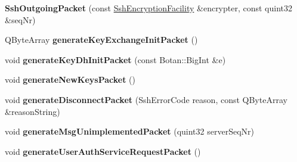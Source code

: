 \begin{DoxyCompactItemize}
\item 
\mbox{\label{class_q_ssh_1_1_internal_1_1_ssh_outgoing_packet_aa417768fd580479f96749cbc91fa8faf}} 
{\bfseries Ssh\+Outgoing\+Packet} (const \mbox{\hyperlink{class_q_ssh_1_1_internal_1_1_ssh_encryption_facility}{Ssh\+Encryption\+Facility}} \&encrypter, const quint32 \&seq\+Nr)
\item 
\mbox{\label{class_q_ssh_1_1_internal_1_1_ssh_outgoing_packet_a1e7a17cf44c369d49f40f5f865a3558f}} 
Q\+Byte\+Array {\bfseries generate\+Key\+Exchange\+Init\+Packet} ()
\item 
\mbox{\label{class_q_ssh_1_1_internal_1_1_ssh_outgoing_packet_a70b75f4a8fb7222a2385e0599aad2878}} 
void {\bfseries generate\+Key\+Dh\+Init\+Packet} (const Botan\+::\+Big\+Int \&e)
\item 
\mbox{\label{class_q_ssh_1_1_internal_1_1_ssh_outgoing_packet_a5cacc93b2fe7a0f1efbaebe824b814e1}} 
void {\bfseries generate\+New\+Keys\+Packet} ()
\item 
\mbox{\label{class_q_ssh_1_1_internal_1_1_ssh_outgoing_packet_ab2b534c66ac6684250ccb1d8e12975b2}} 
void {\bfseries generate\+Disconnect\+Packet} (Ssh\+Error\+Code reason, const Q\+Byte\+Array \&reason\+String)
\item 
\mbox{\label{class_q_ssh_1_1_internal_1_1_ssh_outgoing_packet_ab84cb1817bade7531cfb80b5fd833ac7}} 
void {\bfseries generate\+Msg\+Unimplemented\+Packet} (quint32 server\+Seq\+Nr)
\item 
\mbox{\label{class_q_ssh_1_1_internal_1_1_ssh_outgoing_packet_afa634e3dea6511052328d7ed74f6c4f2}} 
void {\bfseries generate\+User\+Auth\+Service\+Request\+Packet} ()
\item 
\mbox{\label{class_q_ssh_1_1_internal_1_1_ssh_outgoing_packet_ab3d044a980bd8903b5736b894442acbe}} 

\end{DoxyCompactItemize}
